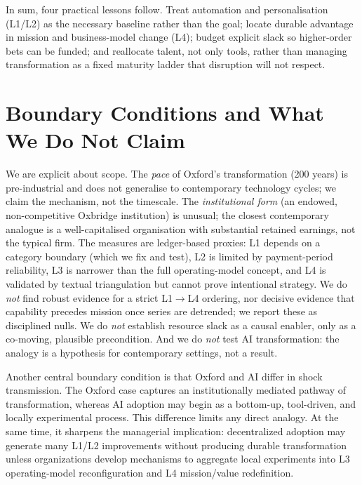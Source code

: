 \documentclass[11pt]{article}
\begin{document}
In sum, four practical lessons follow. Treat automation and personalisation (L1/L2) as the
necessary baseline rather than the goal; locate durable advantage in mission and business-model
change (L4); budget explicit slack so higher-order bets can be funded; and reallocate talent, not
only tools, rather than managing transformation as a fixed maturity ladder that disruption will
not respect.



\section{Boundary Conditions and What We Do Not Claim}
\label{sec:boundary}

We are explicit about scope. The \emph{pace} of Oxford's transformation (200 years) is
pre-industrial and does not generalise to contemporary technology cycles; we claim the mechanism,
not the timescale. The \emph{institutional form} (an endowed, non-competitive Oxbridge
institution) is unusual; the closest contemporary analogue is a well-capitalised organisation
with substantial retained earnings, not the typical firm. The measures are ledger-based proxies:
L1 depends on a category boundary (which we fix and test), L2 is limited by payment-period
reliability, L3 is narrower than the full operating-model concept, and L4 is validated by textual
triangulation but cannot prove intentional strategy. We do \emph{not} find robust evidence for a
strict L1$\rightarrow$L4 ordering, nor decisive evidence that capability precedes mission once
series are detrended; we report these as disciplined nulls. We do \emph{not} establish resource
slack as a causal enabler, only as a co-moving, plausible precondition. And we do \emph{not}
test AI transformation: the analogy is a hypothesis for contemporary settings, not a result.

Another central boundary condition is that Oxford and AI differ in shock transmission. The Oxford case captures an institutionally mediated pathway of transformation, whereas AI adoption may begin as a bottom-up, tool-driven, and locally experimental process. This difference limits any direct analogy. At the same time, it sharpens the managerial implication: decentralized adoption may generate many L1/L2 improvements without producing durable transformation unless organizations develop mechanisms to aggregate local experiments into L3 operating-model reconfiguration and L4 mission/value redefinition.
\end{document}
